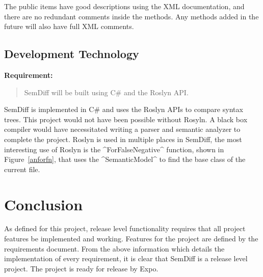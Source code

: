 \documentclass[draftclsnofoot,onecolumn]{IEEEtran}
\begin{document}
The public items have good descriptions using the XML documentation, and there are no redundant comments inside the methods. Any methods added in the future will also have full XML comments.


\subsection{Development Technology}%

\textbf{Requirement:}

\begin{quote}

SemDiff will be built using C\# and the Roslyn API.

\end{quote}

SemDiff is implemented in C\# and uses the Roslyn APIs to compare syntax trees. This project would not have been possible without Rosyln. A black box compiler would have necessitated writing a parser and semantic analyzer to complete the project. Roslyn is used in multiple places in SemDiff, the most interesting use of Roslyn is the ^ForFalseNegative^ function, shown in Figure~\ref{anforfn}, that uses the ^SemanticModel^ to find the base class of the current file.

\section{Conclusion}%

As defined for this project, release level functionality requires that all project features be implemented and working. Features for the project are defined by the requirements document. From the above information which details the implementation of every requirement, it is clear that SemDiff is a release level project. The project is ready for release by Expo.

\end{document}
